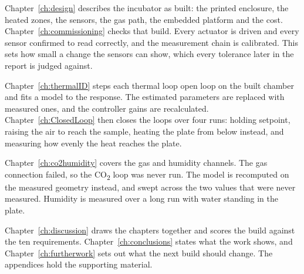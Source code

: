 Chapter~\ref{ch:design} describes the incubator as built: the printed enclosure, the heated zones, the sensors, the gas path, the embedded platform and the cost. Chapter~\ref{ch:commissioning} checks that build. Every actuator is driven and every sensor confirmed to read correctly, and the measurement chain is calibrated. This sets how small a change the sensors can show, which every tolerance later in the report is judged against.

Chapter~\ref{ch:thermalID} steps each thermal loop open loop on the built chamber and fits a model to the response. The estimated parameters are replaced with measured ones, and the controller gains are recalculated. Chapter~\ref{ch:ClosedLoop} then closes the loops over four runs: holding setpoint, raising the air to reach the sample, heating the plate from below instead, and measuring how evenly the heat reaches the plate.

Chapter~\ref{ch:co2humidity} covers the gas and humidity channels. The gas connection failed, so the CO\textsubscript{2} loop was never run. The model is recomputed on the measured geometry instead, and swept across the two values that were never measured. Humidity is measured over a long run with water standing in the plate.

Chapter~\ref{ch:discussion} draws the chapters together and scores the build against the ten requirements. Chapter~\ref{ch:conclusions} states what the work shows, and Chapter~\ref{ch:furtherwork} sets out what the next build should change. The appendices hold the supporting material.
